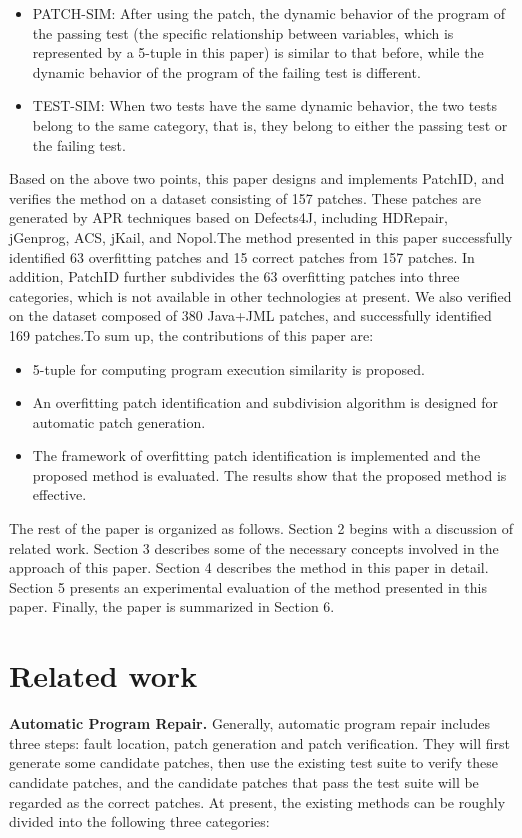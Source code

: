 \documentclass[sn-basic]{sn-jnl}
\theoremstyle{thmstyleone}
\theoremstyle{thmstyletwo}
\theoremstyle{thmstylethree}
\begin{document}
\begin{itemize}
	\item PATCH-SIM: After using the patch, the dynamic behavior of the program of the passing test (the specific relationship between variables, which is represented by a 5-tuple in this paper) is similar to that before, while the dynamic behavior of the program of the failing test is different.
	\item TEST-SIM: When two tests have the same dynamic behavior, the two tests belong to the same category, that is, they belong to either the passing test or the failing test.
\end{itemize}

Based on the above two points, this paper designs and implements PatchID, and verifies the method on a dataset consisting of 157 patches. These patches are generated by APR techniques based on Defects4J, including HDRepair, jGenprog\citep{bib65}, ACS\citep{bib66}, jKail\citep{bib67}, and Nopol\citep{bib40}.The method presented in this paper successfully identified 63 overfitting patches and 15 correct patches from 157 patches. In addition, PatchID further subdivides the 63 overfitting patches into three categories, which is not available in other technologies at present. We also verified on the dataset composed of 380 Java+JML patches, and successfully identified 169 patches.To sum up, the contributions of this paper are:
\begin{itemize}
	\item 5-tuple for computing program execution similarity is proposed.
	\item An overfitting patch identification and subdivision algorithm is designed for automatic patch generation.
	\item The framework of overfitting patch identification is implemented and the proposed method is evaluated. The results show that the proposed method is effective.
\end{itemize}

The rest of the paper is organized as follows. Section 2 begins with a discussion of related work. Section 3 describes some of the necessary concepts involved in the approach of this paper. Section 4 describes the method in this paper in detail. Section 5 presents an experimental evaluation of the method presented in this paper. Finally, the paper is summarized in Section 6.

\section{Related work}\label{sec2}
\textbf{Automatic Program Repair.} Generally, automatic program repair includes three steps: fault location, patch generation and patch verification. They will first generate some candidate patches, then use the existing test suite to verify these candidate patches, and the candidate patches that pass the test suite will be regarded as the correct patches. At present, the existing methods can be roughly divided into the following three categories:
\end{document}
